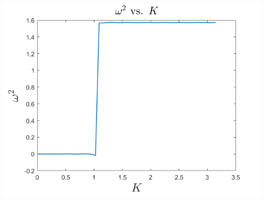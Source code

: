 \documentclass{article}
\begin{document}
\begin{center}
    \includegraphics[scale = 0.6]{omegasqrvsk.png}
\end{center}
\end{document}
